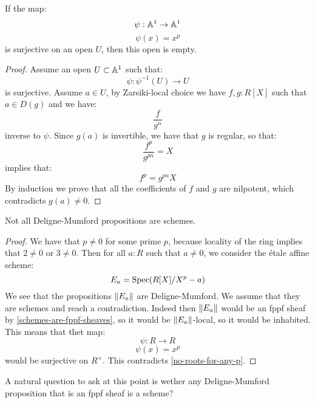\begin{lemma}\label{no-roots-for-any-p}
If the map:
\[\psi:\mathbb{A}^1\to \mathbb{A}^1\]
\[\psi(x)=x^p\] 
is surjective on an open $U$, then this open is empty.
\end{lemma}

\begin{proof}
Assume an open $U\subset \mathbb{A}^1$ such that:
\[\psi: \psi^{-1}(U) \to U\]
is surjective. Assume $a\in U$, by Zarsiki-local choice we have $f,g:R[X]$ such that $a\in D(g)$ and we have:
\[\frac{f}{g^n}\]
inverse to $\psi$. Since $g(a)$ is invertible, we have that $g$ is regular, so that:
\[\frac{f^p}{g^{pn}} = X\]
implies that:
\[f^p = g^{pn}X\]
By induction we prove that all the coefficients of $f$ and $g$ are nilpotent, which contradicts $g(a)\not=0$.
\end{proof}

\begin{proposition}
Not all Deligne-Mumford propositions are schemes.
\end{proposition}

\begin{proof}
We have that $p\not=0$ for some prime $p$, because locality of the ring implies that $2\not=0$ or $3\not=0$. Then for all $a:R$ such that $a\not=0$, we consider the étale affine scheme:
\[E_a = \operatorname{Spec}(R[X]/X^p-a)\]
We see that the propositions $\lVert E_a \rVert$ are Deligne-Mumford. We assume that they are schemes and reach a contradiction. Indeed then $\lVert E_a \rVert$ would be an fppf sheaf by \cref{schemes-are-fppf-sheaves}, so it would be $\lVert E_a \rVert$-local, so it would be inhabited. This means that thet map:
\[\psi:R\to R\]
\[\psi(x)=x^p\]
would be surjective on $R^\times$. This contradicts \cref{no-roots-for-any-p}.
\end{proof}

A natural question to ask at this point is wether any Deligne-Mumford proposition that is an fppf sheaf is a scheme?
